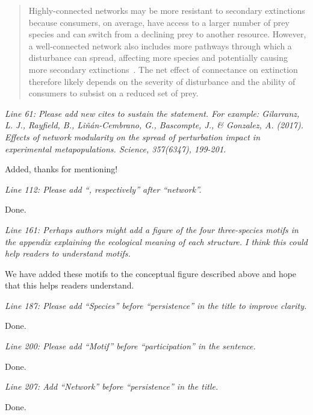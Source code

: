 \documentclass[12pt]{article}
\newcommand{\us}{\rm \setlength{\leftskip}{0.3cm} \setlength{\rightskip}{0.3cm}}
\newcommand{\them}{\it \setlength{\leftskip}{0cm} \setlength{\rightskip}{0cm}}
\begin{document}
            \begin{quotation}
                 Highly-connected networks may be more resistant to secondary extinctions \citep{Dunne2002, Eklof2006} because consumers, on average, have access to a larger number of prey species and can switch from a declining prey to another resource. However, a well-connected network also includes more pathways through which a disturbance can spread, affecting more species and potentially causing more secondary extinctions~\citep{Vieira2015}.
                    The net effect of connectance on extinction therefore likely depends on the severity of disturbance and the ability of consumers to subsist on a reduced set of prey.    
            \end{quotation}
        
        
        \them
        Line 61: Please add new cites to sustain the statement. For example:
        Gilarranz, L. J., Rayfield, B., Liñán-Cembrano, G., Bascompte, J., \& Gonzalez, A. (2017). Effects of network modularity on the spread of perturbation impact in experimental metapopulations. Science, 357(6347), 199-201.
        
        \us
        Added, thanks for mentioning!
        
        \them
        Line 112: Please add “, respectively” after “network”.
        
        \us
        Done.
        
        \them
        Line 161: Perhaps authors might add a figure of the four three-species motifs in the appendix explaining the ecological meaning of each structure. I think this could help readers to understand motifs.
        
        \us We have added these motifs to the conceptual figure described above and hope that this helps readers understand.
        
        \them
        Line 187: Please add “Species” before “persistence” in the title to improve clarity.
        
        \us
        Done.
        
        \them
        Line 200: Please add “Motif” before “participation” in the sentence.
        
        \us
        Done.
        
        \them
        Line 207: Add “Network” before “persistence” in the title.
        
        \us
        Done.
        
\end{document}
